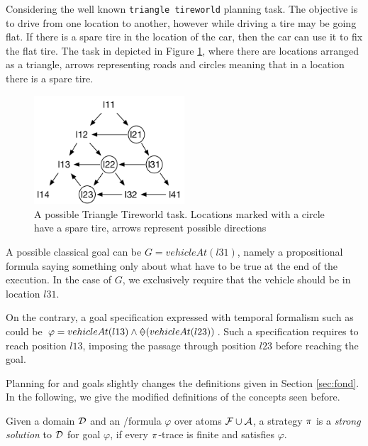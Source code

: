 \begin{example}\label{ex:pla-temp-simple}
Considering the well known \texttt{triangle tireworld} \FOND planning task. The objective is to drive from one location to another, however while driving a tire may be going flat. If there is a spare tire in the location of the car, then the car can use it to fix the flat tire. The task in depicted in Figure \ref{fig:ttireworld-task}, where there are locations arranged as a triangle, arrows representing roads and circles meaning that in a location there is a spare tire. 

\begin{figure}[h]
\centering
\includegraphics[width=0.5\textwidth]{images/ttireworld-task}
\caption{A possible Triangle Tireworld task. Locations marked with a circle have a spare tire, arrows represent possible directions} 
\label{fig:ttireworld-task}
\end{figure}

A possible classical goal can be $G = vehicleAt(l31)$, namely a propositional formula saying something only about what have to be true at the end of the execution. In the case of $G$, we exclusively require that the vehicle should be in location $l31$.

On the contrary, a goal specification expressed with temporal formalism such as \PLTL could be $\varphi = vehicleAt(l13) \lAND \Once(vehicleAt(l23))$. Such a specification requires to reach position $l13$, imposing the passage through position $l23$ before reaching the goal.
\end{example}

Planning for \LTLf and \PLTL goals slightly changes the definitions given in Section \ref{sec:fond}. In the following, we give the modified definitions of the concepts seen before.

\begin{definition}\label{def:strong-sol-extend}
Given a domain $\mathcal{D}$ and an \LTLf/\PLTL formula $\varphi$ over atoms $\mathcal{F} \cup \mathcal{A}$, a strategy $\pi$ is a \textit{strong solution} to $\mathcal{D}$ for goal $\varphi$, if every $\pi$-trace is finite and satisfies $\varphi$.
\end{definition}

